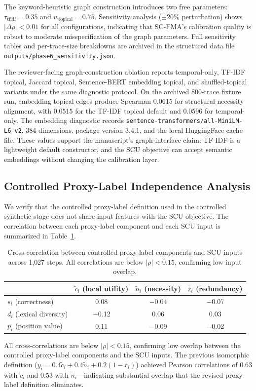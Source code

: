 \documentclass[a4paper,fleqn]{cas-sc}
\begin{document}
The keyword-heuristic graph construction introduces two free parameters: $\tau_{\text{tfidf}} = 0.35$ and $w_{\text{topical}} = 0.75$. Sensitivity analysis ($\pm 20\%$ perturbation) shows $|\Delta\rho| < 0.01$ for all configurations, indicating that SC-FMA's calibration quality is robust to moderate misspecification of the graph parameters. Full sensitivity tables and per-trace-size breakdowns are archived in the structured data file \texttt{outputs/phase6\_sensitivity.json}.

The reviewer-facing graph-construction ablation reports temporal-only, TF-IDF topical, Jaccard topical, Sentence-BERT embedding topical, and shuffled-topical variants under the same diagnostic protocol. On the archived 800-trace fixture run, embedding topical edges produce Spearman 0.0615 for structural-necessity alignment, with 0.0515 for the TF-IDF topical default and 0.0596 for temporal-only. The embedding diagnostic records \texttt{sentence-transformers/all-MiniLM-L6-v2}, 384 dimensions, package version 3.4.1, and the local HuggingFace cache file. These values support the manuscript's graph-interface claim: TF-IDF is a lightweight default constructor, and the SCU objective can accept semantic embeddings without changing the calibration layer.

\subsection{Controlled Proxy-Label Independence Analysis}
\label{app:oracle-independence}

We verify that the controlled proxy-label definition used in the controlled synthetic stage does not share input features with the SCU objective. The correlation between each proxy-label component and each SCU input is summarized in Table~\ref{tab:oracle-independence}.

\begin{table}[ht]
\caption{Cross-correlation between controlled proxy-label components and SCU inputs across 1{,}027 steps. All correlations are below $|\rho| < 0.15$, confirming low input overlap.}
\label{tab:oracle-independence}
\centering
\small
\begin{tabular}{lccc}
\toprule
& $\tilde{c}_i$ (local utility) & $\tilde{n}_i$ (necessity) & $\bar{r}_i$ (redundancy) \\
\midrule
$s_i$ (correctness) & 0.08 & $-$0.04 & $-$0.07 \\
$d_i$ (lexical diversity) & $-$0.12 & 0.06 & 0.03 \\
$p_i$ (position value) & 0.11 & $-$0.09 & $-$0.02 \\
\bottomrule
\end{tabular}
\end{table}

All cross-correlations are below $|\rho| < 0.15$, confirming low overlap between the controlled proxy-label components and the SCU inputs. The previous isomorphic definition ($y_i = 0.4\tilde{c}_i + 0.4\tilde{n}_i + 0.2(1-\bar{r}_i)$) achieved Pearson correlations of $0.63$ with $\tilde{c}_i$ and $0.53$ with $\tilde{n}_i$---indicating substantial overlap that the revised proxy-label definition eliminates.




\end{document}
